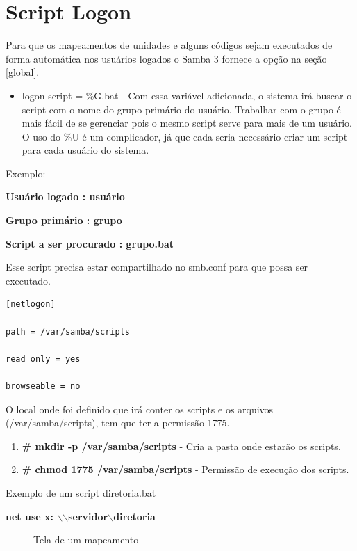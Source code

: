 \section{Script Logon}

Para que os mapeamentos de unidades e alguns códigos sejam executados de forma automática nos usuários logados o Samba 3 fornece a opção na seção [global]. 

\begin{itemize}
	\item {logon script = \%G.bat } - Com essa variável adicionada, o sistema irá buscar o script com o nome do grupo primário do usuário. Trabalhar com o grupo é mais fácil de se gerenciar pois o mesmo script serve para mais de um usuário. O uso do \%U é um complicador, já que cada seria necessário criar um script para cada usuário do sistema.
\end{itemize}

Exemplo: 

\textbf{Usuário logado : usuário}

\textbf{Grupo primário : grupo}

\textbf{Script a ser procurado : grupo.bat}

Esse script precisa estar compartilhado no smb.conf para que possa ser executado.\\

\begin{lstlisting}	
[netlogon] 

path = /var/samba/scripts 

read only = yes 

browseable = no	

\end{lstlisting}

O local onde foi definido que irá conter os scripts e os arquivos (/var/samba/scripts), tem que ter a permissão 1775. 

\begin{enumerate}
	\item \textbf{\# mkdir -p /var/samba/scripts} - Cria a pasta onde estarão os scripts.
	\item \textbf{\# chmod 1775 /var/samba/scripts} - Permissão de execução dos scripts.
\end{enumerate}

Exemplo de um script diretoria.bat 

\textbf{net use x: $\backslash$$\backslash$servidor$\backslash$diretoria}

\begin{figure}[ht]
   	\centering
   	\caption{Tela de um mapeamento}
    \label{mapeamento}
\end{figure} 

